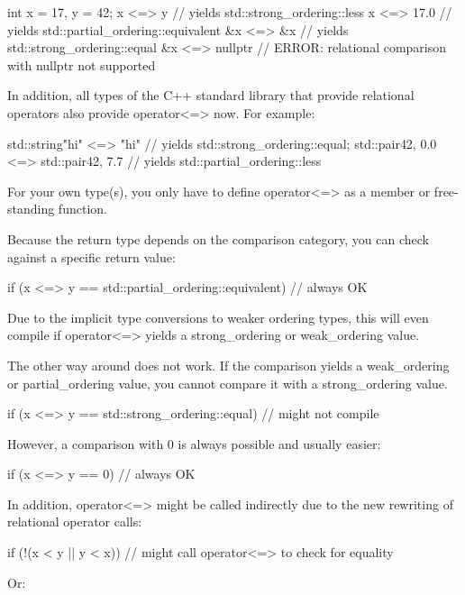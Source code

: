 \begin{cpp}
int x = 17, y = 42;
x <=> y // yields std::strong_ordering::less
x <=> 17.0 // yields std::partial_ordering::equivalent
&x <=> &x // yields std::strong_ordering::equal
&x <=> nullptr // ERROR: relational comparison with nullptr not supported
\end{cpp}

In addition, all types of the C++ standard library that provide relational operators also provide operator<=> now. For example:

\begin{cpp}
std::string{"hi"} <=> "hi" // yields std::strong_ordering::equal;
std::pair{42, 0.0} <=> std::pair{42, 7.7} // yields std::partial_ordering::less
\end{cpp}

For your own type(s), you only have to define operator<=> as a member or free-standing function.

Because the return type depends on the comparison category, you can check against a specific return value:

\begin{cpp}
if (x <=> y == std::partial_ordering::equivalent) // always OK
\end{cpp}

Due to the implicit type conversions to weaker ordering types, this will even compile if operator<=> yields a strong\_ordering or weak\_ordering value.

The other way around does not work. If the comparison yields a weak\_ordering or partial\_ordering value, you cannot compare it with a strong\_ordering value.

\begin{cpp}
if (x <=> y == std::strong_ordering::equal) // might not compile
\end{cpp}

However, a comparison with 0 is always possible and usually easier:

\begin{cpp}
if (x <=> y == 0) // always OK
\end{cpp}

In addition, operator<=> might be called indirectly due to the new rewriting of relational operator calls:

\begin{cpp}
if (!(x < y || y < x)) // might call operator<=> to check for equality
\end{cpp}

Or:

